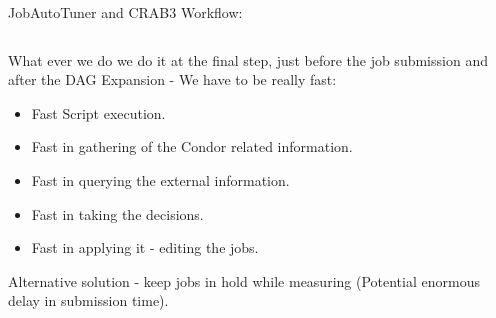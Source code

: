 \documentclass[8pt,mathserif,a4paper,oneside,pdf]{beamer}
\begin{document}
\begin{frame}[fragile]{JobAutoTuner and CRAB3 Workflow:}

  \begin{columns}

    \begin{column}[T]{7cm}
      What ever we do we do it at the final step, just before the job submission and after the DAG Expansion - We have to be really fast:
      \begin{itemize}
      \item
        Fast Script execution.
      \item
        Fast in gathering of the Condor related information.
      \item
        Fast in querying the external information.
      \item
        Fast in taking the decisions.
      \item
        Fast in applying it - editing the jobs.
      \end{itemize}
      Alternative solution - keep jobs in hold while measuring (Potential enormous delay in submission time).
    \end{column}

    \begin{column}[T]{5cm}
      {}
    \end{column}
  \end{columns}

\end{frame}
\end{document}
